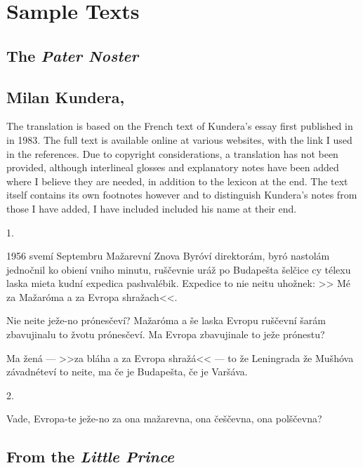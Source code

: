\chapter{Sample Texts}

\section{The \emph{Pater Noster}}

\section{Milan Kundera, }

{\small
The translation is based on the French text of Kundera's essay  first published in  in 1983. The full text is available online at various websites, with the link I used in the references. Due to copyright considerations, a translation has not been provided, although interlineal glosses and explanatory notes have been added where  I believe they are needed, in addition to the lexicon at the end. The text itself contains its own footnotes however and to distinguish Kundera's notes from those I have added, I have included included his name at their end.
}

\begin{center}1.\end{center}

1956 svemí Septembru Mažarevní Znova Byróví direktorám, byró
nastolám jednočnil ko obiení vniho minutu, ruščevnie uráž
po Budapešta šelčice cy télexu laska mieta kudní expedica
pashvalébik. Expedice to nie neitu uhožnek: >> Mé za Mažaróma a
za Evropa shražach<<.

Nie neite ježe-no prónesčeví? Mažaróma a še laska Evropu ruščevní šarám zbavujinalu to žvotu prónesčeví. Ma Evropa zbavujinale to ježe prónestu?

Ma žená --- >>za bláha a za Evropa shražá<< --- to že Leningrada že Mušhóva závadnéteví to neite, ma če je Budapešta, če je Varšáva.

\begin{center}2.\end{center}
Vade, Evropa-te ježe-no za ona mažarevna, ona češčevna, ona polščevna?


\section{From the \emph{Little Prince}}

